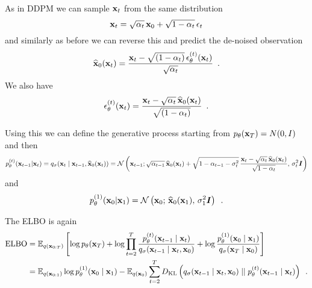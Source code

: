 As in DDPM we can sample ${\mathbf{x}}_t$ from the same distribution
\begin{equation}
    {\mathbf{x}}_t = \sqrt{\alpha_t} \, {\mathbf{x}}_0 + \sqrt{1-\alpha_t}\, {\mathbf{\epsilon}}_t
\end{equation}
and similarly as before we can reverse this and predict the de-noised observation
\begin{equation}
    \widehat{{\mathbf{x}}}_0({\mathbf{x}}_t) = \frac{{\mathbf{x}}_t - \sqrt{(1 - \alpha_t)} \, \epsilon^{(t)}_\theta({\mathbf{x}}_t)}{\sqrt{\alpha_t}} \enspace .
\end{equation}
We also have 
\begin{equation}
    \epsilon^{(t)}_\theta({\mathbf{x}}_t) = 
    \frac{{\mathbf{x}}_t - \sqrt{\alpha_t} \, \widehat{{\mathbf{x}}}_0({\mathbf{x}}_t)}{\sqrt{(1 - \alpha_t)}} \enspace .
\end{equation}


Using this we can define the generative process starting from $p_{\theta}({\mathbf{x}}_T) = N(0, I)$ and then
\begin{equation}
    p_{\theta}^{(t)}({\mathbf{x}}_{t-1} | {\mathbf{x}}_t) = q_{\sigma}({\mathbf{x}}_t \mid {\mathbf{x}}_{t-1}, \widehat{{\mathbf{x}}}_0({\mathbf{x}}_t)) = 
    \mathcal{N} \left( {\mathbf{x}}_{t-1};
    \sqrt{\alpha_{t-1}}\, \widehat{{\mathbf{x}}}_0({\mathbf{x}}_t)
    + \sqrt{1 - \alpha_{t-1} - \sigma_t^2} \, \frac{{\mathbf{x}}_t - \sqrt{\alpha_t}\, \widehat{{\mathbf{x}}}_0({\mathbf{x}}_t)}{\sqrt{1-\alpha_t}}, \, \sigma_t^2 {\bm{I}}
    \right) 
\end{equation}
and
\begin{equation}
    p_{\theta}^{(1)}({\mathbf{x}}_{0} | {\mathbf{x}}_1) = 
    \mathcal{N} \left( {\mathbf{x}}_{0};\, \widehat{{\mathbf{x}}}_0({\mathbf{x}}_1),\, \sigma_1^2 {\bm{I}}
    \right) \enspace .
\end{equation}

The ELBO is again
\begin{align}
    \text{ELBO} & = \mathbb{E}_{q({\mathbf{x}}_{0:T})} \left[ \log p_{\theta}({\mathbf{x}}_T) + \log \prod_{t=2}^T 
    \frac{p_{\theta}^{(t)}({\mathbf{x}}_{t-1} \mid {\mathbf{x}}_{t})}
    {q_{\sigma}({\mathbf{x}}_{t-1} \mid {\mathbf{x}}_{t}, {\mathbf{x}}_0)} 
    + \log \frac{p_{\theta}^{(1)}({\mathbf{x}}_{0} \mid {\mathbf{x}}_{1})}{q_{\sigma}({\mathbf{x}}_{T} \mid {\mathbf{x}}_0)}
    \right] \nonumber \\
    & = \mathbb{E}_{q({\mathbf{x}}_{0:1})} \log p_{\theta}^{(1)}({\mathbf{x}}_{0} \mid {\mathbf{x}}_{1}) 
    - \mathbb{E}_{q({\mathbf{x}}_{0})} \sum_{t=2}^T D_{\mathrm{KL}}\left( q_{\sigma}({\mathbf{x}}_{t-1} \mid {\mathbf{x}}_{t}, {\mathbf{x}}_0) \mid\mid p_{\theta}^{(t)}({\mathbf{x}}_{t-1} \mid {\mathbf{x}}_{t}) \right) \enspace .
\end{align}

